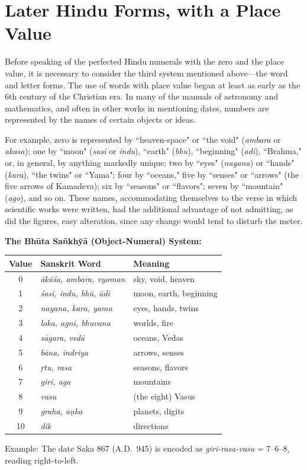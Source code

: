 \documentclass[11pt,a4paper]{article}
\newenvironment{enhancednote}{%
  \begin{tcolorbox}[colback=enhancedbg,colframe=notecolor,boxrule=1pt,
    left=10pt,right=10pt,top=8pt,bottom=8pt,
    title={\textbf{Enhanced Edition Note}},fonttitle=\bfseries\color{notecolor}]
}{\end{tcolorbox}}
\begin{document}
\newpage

\section{Later Hindu Forms, with a Place Value}

Before speaking of the perfected Hindu numerals with the zero and the place value, it is necessary to consider the third system mentioned above---the word and letter forms. The use of words with place value began at least as early as the 6th century of the Christian era. In many of the manuals of astronomy and mathematics, and often in other works in mentioning dates, numbers are represented by the names of certain objects or ideas.

For example, zero is represented by ``heaven-space" or ``the void" (\textit{ambara} or \textit{akasa}); one by ``moon" (\textit{sasi} or \textit{indu}), ``earth" (\textit{bhu}), ``beginning" (\textit{adi}), ``Brahma," or, in general, by anything markedly unique; two by ``eyes" (\textit{nayana}) or ``hands" (\textit{kara}), ``the twins" or ``Yama"; four by ``oceans," five by ``senses" or ``arrows" (the five arrows of Kamadeva); six by ``seasons" or ``flavors"; seven by ``mountain" (\textit{ago}), and so on. These names, accommodating themselves to the verse in which scientific works were written, had the additional advantage of not admitting, as did the figures, easy alteration, since any change would tend to disturb the meter.

\begin{enhancednote}
\textbf{The Bh\=uta Sa\~nkh\=y\=a (Object-Numeral) System:}

\begin{center}
\begin{tabular}{|c|l|l|}
\hline
\textbf{Value} & \textbf{Sanskrit Word} & \textbf{Meaning} \\
\hline
0 & \textit{\=ak\=a\'sa, ambara, vyoman} & sky, void, heaven \\
1 & \textit{\'sasi, indu, bh\=u, \=adi} & moon, earth, beginning \\
2 & \textit{nayana, kara, yama} & eyes, hands, twins \\
3 & \textit{loka, agni, bhuvana} & worlds, fire \\
4 & \textit{s\=agara, ved\=a} & oceans, Vedas \\
5 & \textit{b\=ana, indriya} & arrows, senses \\
6 & \textit{\d{r}tu, rasa} & seasons, flavors \\
7 & \textit{giri, aga} & mountains \\
8 & \textit{vasu} & (the eight) Vasus \\
9 & \textit{graha, a\d{n}ka} & planets, digits \\
10 & \textit{dik} & directions \\
\hline
\end{tabular}
\end{center}

Example: The date Saka 867 (A.D.~945) is encoded as \textit{giri-rasa-vasu} = 7--6--8, reading right-to-left.
\end{enhancednote}
\end{document}
